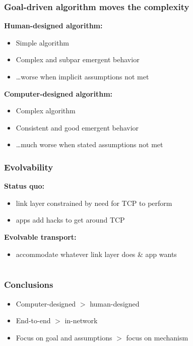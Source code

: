 \documentclass[svgnames]{beamer}
\begin{document}
\begin{frame}
\frametitle{Goal-driven algorithm \textbf{moves} the complexity}

\textbf{Human-designed algorithm:}

\begin{itemize}
\item Simple algorithm
\item Complex and subpar emergent behavior
\item \ldots worse when implicit assumptions not met
\end{itemize}

\textbf{Computer-designed algorithm:}

\begin{itemize}
\item Complex algorithm
\item Consistent and good emergent behavior
\item \ldots much worse when stated assumptions not met
\end{itemize}

\end{frame}

\begin{frame}
\frametitle{Evolvability}

\textbf{Status quo:}

\begin{itemize}

\item link layer constrained by need for TCP to perform
\item apps add hacks to get around TCP

\end{itemize}

\textbf{Evolvable transport:}

\begin{itemize}

\item accommodate whatever link layer does \& app wants

\end{itemize}

\end{frame}

\section{}

\begin{frame}
\frametitle{Conclusions}

\begin{itemize}

\item Computer-designed $>$ human-designed

\item End-to-end $>$ in-network

\item Focus on goal and assumptions $>$ focus on mechanism

\end{itemize}

\end{frame}
\end{document}
